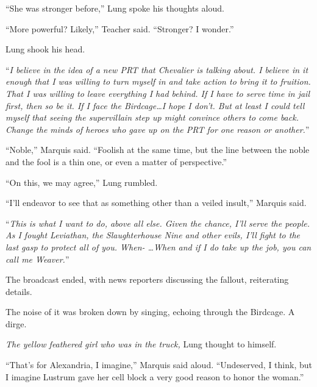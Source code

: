 ``She was stronger before,'' Lung spoke his thoughts aloud.



``More powerful?  Likely,'' Teacher said.  ``Stronger?  I wonder.''



Lung shook his head.



``\emph{I believe in the idea of a new PRT that Chevalier is talking about.  I believe in it enough that I was willing to turn myself in and take action to bring it to fruition.  That I was willing to leave everything I had behind.  If I have to serve time in jail first, then so be it.  If I face the Birdcage\ldots I hope I don't.  But at least I could tell myself that seeing the supervillain step up might convince others to come back.  Change the minds of heroes who gave up on the PRT for one reason or another.}''



``Noble,'' Marquis said.  ``Foolish at the same time, but the line between the noble and the fool is a thin one, or even a matter of perspective.''



``On this, we may agree,'' Lung rumbled.



``I'll endeavor to see that as something other than a veiled insult,'' Marquis said.



``\emph{This is what I want to do, above all else.  Given the chance, I'll serve the people.  As I fought Leviathan, the Slaughterhouse Nine and other evils, I'll fight to the last gasp to protect all of you.  When-  \ldots{}When and if I do take up the job, you can call me Weaver.}''



The broadcast ended, with news reporters discussing the fallout, reiterating details.



The noise of it was broken down by singing, echoing through the Birdcage.  A dirge.



\emph{The yellow feathered girl who was in the truck, }Lung thought to himself.



``That's for Alexandria, I imagine,'' Marquis said aloud.  ``Undeserved, I think, but I imagine Lustrum gave her cell block a very good reason to honor the woman.''



